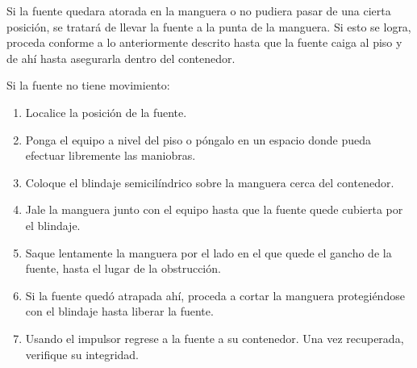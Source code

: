 Si la fuente quedara atorada en la manguera o no pudiera pasar de una cierta posición, se tratará de llevar la fuente a la punta de la manguera. Si esto se logra, proceda conforme a lo anteriormente descrito hasta que la fuente caiga al piso y de ahí hasta asegurarla dentro del contenedor.

Si la fuente no tiene movimiento:
\begin{enumerate}
  \item Localice la posición de la fuente.
  \item Ponga el equipo a nivel del piso o póngalo en un espacio donde pueda efectuar libremente las maniobras.
  \item Coloque el blindaje semicilíndrico sobre la manguera cerca del contenedor.
  \item Jale la manguera junto con el equipo hasta que la fuente quede cubierta por el blindaje.
  \item Saque lentamente la manguera por el lado en el que quede el gancho de la fuente, hasta el lugar de la obstrucción.
  \item Si la fuente quedó atrapada ahí, proceda a cortar la manguera protegiéndose con el blindaje hasta liberar la fuente.
  \item Usando el impulsor regrese a la fuente a su contenedor. Una vez recuperada, verifique su integridad.

\end{enumerate}
